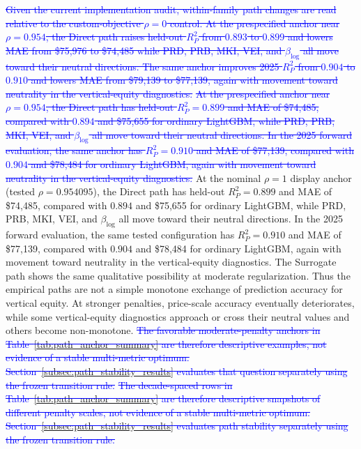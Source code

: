 \documentclass[10pt]{article}
\theoremstyle{definition}
\newcommand{\1}{\mathbf{1}}
\newcommand{\oldtext}[1]{\textcolor{blue}{\sout{#1}}}
\newcommand{\newtext}[1]{\textcolor{impGreen}{#1}}
\newcommand{\latesttext}[1]{\textcolor{latestPurple}{#1}}
\begin{document}
\oldtext{Given the current implementation audit, within-family path changes are read relative to the custom-objective $\rho=0$ control. At the prespecified anchor near $\rho=0.954$, the Direct path raises held-out $R^2_P$ from $0.893$ to $0.899$ and lowers MAE from \$75,976 to \$74,485 while PRD, PRB, MKI, VEI, and $\beta_{\log}$ all move toward their neutral directions. The same anchor improves 2025 $R^2_P$ from $0.904$ to $0.910$ and lowers MAE from \$79,139 to \$77,139, again with movement toward neutrality in the vertical-equity diagnostics.}
\oldtext{At the prespecified anchor near $\rho=0.954$, the Direct path has held-out $R^2_P=0.899$ and MAE of \$74,485, compared with $0.894$ and \$75,655 for ordinary LightGBM, while PRD, PRB, MKI, VEI, and $\beta_{\log}$ all move toward their neutral directions. In the 2025 forward evaluation, the same anchor has $R^2_P=0.910$ and MAE of \$77,139, compared with $0.904$ and \$78,484 for ordinary LightGBM, again with movement toward neutrality in the vertical-equity diagnostics.}
\latesttext{At the nominal $\rho=1$ display anchor (tested $\rho=0.954095$), the Direct path has held-out $R^2_P=0.899$ and MAE of \$74,485, compared with $0.894$ and \$75,655 for ordinary LightGBM, while PRD, PRB, MKI, VEI, and $\beta_{\log}$ all move toward their neutral directions. In the 2025 forward evaluation, the same tested configuration has $R^2_P=0.910$ and MAE of \$77,139, compared with $0.904$ and \$78,484 for ordinary LightGBM, again with movement toward neutrality in the vertical-equity diagnostics.} The Surrogate path shows the same qualitative possibility at moderate
regularization. 
\newtext{Thus the empirical paths are not a simple monotone exchange of prediction accuracy for vertical equity. At stronger penalties, price-scale accuracy eventually deteriorates, while some vertical-equity diagnostics approach or cross their neutral values and others become non-monotone.}
\oldtext{The favorable moderate-penalty anchors in Table~\ref{tab:path_anchor_summary} are therefore descriptive examples, not evidence of a stable multi-metric optimum. Section~\ref{subsec:path_stability_results} evaluates that question separately using the frozen transition rule.}
\oldtext{The decade-spaced rows in Table~\ref{tab:path_anchor_summary} are therefore descriptive snapshots of different penalty scales, not evidence of a stable multi-metric optimum. Section~\ref{subsec:path_stability_results} evaluates path stability separately using the frozen transition rule.}
\end{document}
